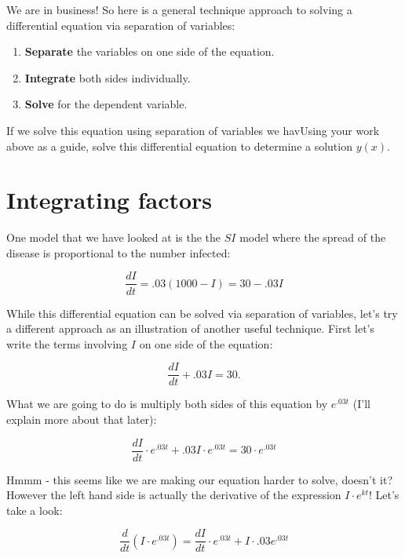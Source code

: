 \documentclass[
]{book}
\providecommand{\tightlist}{%
  \setlength{\itemsep}{0pt}\setlength{\parskip}{0pt}}
\theoremstyle{definition}
\theoremstyle{definition}
\theoremstyle{definition}
\theoremstyle{remark}
\begin{document}
We are in business! So here is a general technique approach to solving a differential equation via separation of variables:

\begin{enumerate}
\def\labelenumi{\arabic{enumi}.}
\tightlist
\item
  \textbf{Separate} the variables on one side of the equation.
\item
  \textbf{Integrate} both sides individually.
\item
  \textbf{Solve} for the dependent variable.
\end{enumerate}

If we solve this equation using separation of variables we havUsing your work above as a guide, solve this differential equation to determine a solution \(y(x)\).

\hypertarget{integrating-factors}{%
\section{Integrating factors}\label{integrating-factors}}

One model that we have looked at is the the \(SI\) model where the spread of the disease is proportional to the number infected:

\begin{equation*}
\frac{dI}{dt} = .03(1000-I) = 30  - .03I
\end{equation*}

While this differential equation can be solved via separation of variables, let's try a different approach as an illustration of another useful technique. First let's write the terms involving \(I\) on one side of the equation:

\begin{equation*}
\frac{dI}{dt} + .03I = 30.
\end{equation*}

What we are going to do is multiply both sides of this equation by \(e^{.03t}\) (I'll explain more about that later):

\begin{equation*}
\frac{dI}{dt} \cdot e^{.03t} + .03I \cdot e^{.03t} = 30  \cdot e^{.03t}
\end{equation*}

Hmmm - this seems like we are making our equation harder to solve, doesn't it? However the left hand side is actually the derivative of the expression \(I \cdot e^{kt}\)! Let's take a look:

\begin{equation*}
\frac{d}{dt} \left( I \cdot e^{.03t} \right) = \frac{dI}{dt} \cdot e^{.03t} + I \cdot .03 e^{.03t}
\end{equation*}
\end{document}
